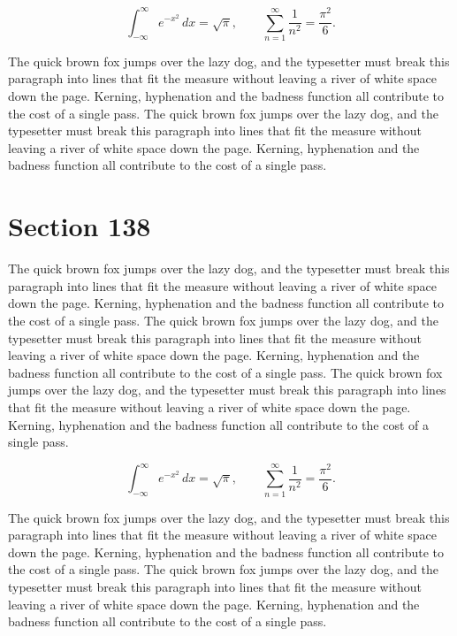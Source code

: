 \documentclass{article}
\begin{document}
\begin{equation}
\int_{-\infty}^{\infty} e^{-x^{2}}\,dx = \sqrt{\pi}, \qquad
\sum_{n=1}^{\infty} \frac{1}{n^{2}} = \frac{\pi^{2}}{6}.
\end{equation}

The quick brown fox jumps over the lazy dog, and the typesetter must break this paragraph into lines that fit the measure without leaving a river of white space down the page. Kerning, hyphenation and the badness function all contribute to the cost of a single pass. The quick brown fox jumps over the lazy dog, and the typesetter must break this paragraph into lines that fit the measure without leaving a river of white space down the page. Kerning, hyphenation and the badness function all contribute to the cost of a single pass. 
\section{Section 138}
The quick brown fox jumps over the lazy dog, and the typesetter must break this paragraph into lines that fit the measure without leaving a river of white space down the page. Kerning, hyphenation and the badness function all contribute to the cost of a single pass. The quick brown fox jumps over the lazy dog, and the typesetter must break this paragraph into lines that fit the measure without leaving a river of white space down the page. Kerning, hyphenation and the badness function all contribute to the cost of a single pass. The quick brown fox jumps over the lazy dog, and the typesetter must break this paragraph into lines that fit the measure without leaving a river of white space down the page. Kerning, hyphenation and the badness function all contribute to the cost of a single pass. 

\begin{equation}
\int_{-\infty}^{\infty} e^{-x^{2}}\,dx = \sqrt{\pi}, \qquad
\sum_{n=1}^{\infty} \frac{1}{n^{2}} = \frac{\pi^{2}}{6}.
\end{equation}

The quick brown fox jumps over the lazy dog, and the typesetter must break this paragraph into lines that fit the measure without leaving a river of white space down the page. Kerning, hyphenation and the badness function all contribute to the cost of a single pass. The quick brown fox jumps over the lazy dog, and the typesetter must break this paragraph into lines that fit the measure without leaving a river of white space down the page. Kerning, hyphenation and the badness function all contribute to the cost of a single pass. 
\end{document}
